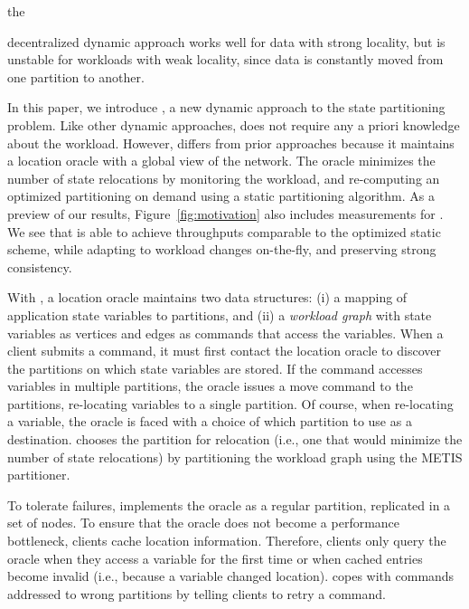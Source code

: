 the {decentralized dynamic approach works well for data with strong
  locality, but is unstable for workloads with weak locality, since
  data is constantly moved from one partition to another.


In this paper, we introduce \dynastar, a new dynamic approach to the
state partitioning problem.  Like other dynamic approaches, \dynastar
does not require any a priori knowledge about the workload. However,
\dynastar differs from prior approaches because it maintains a
location oracle with a global view of the network.  The oracle minimizes the
number of state relocations by monitoring the workload, and
re-computing an optimized partitioning on demand using a static
partitioning algorithm.  As a preview of our results,
Figure~\ref{fig:motivation} also includes measurements for \dynastar.
We see that \dynastar is able to achieve throughputs comparable to
the optimized static scheme, while adapting to workload changes
on-the-fly, and preserving strong consistency.


With \dynastar, a location oracle maintains two data structures: (i) a
mapping of application state variables to partitions, and (ii) a \emph{workload graph}
with state variables as vertices and edges as commands that access the
variables.  When a client submits a command, it must first contact the
location oracle to discover the partitions on which state variables are
stored.  If the command accesses variables in multiple partitions, the
oracle issues a move command to the partitions, re-locating variables to
a single partition. Of course, when re-locating a variable, the oracle
is faced with a choice of which partition to use as a destination.
\dynastar chooses the partition for relocation (i.e., one that
would minimize the number of state relocations) by partitioning the
workload graph using the METIS partitioner.

To tolerate failures, \dynastar implements the oracle as a regular partition, replicated in a set of nodes.
To ensure that the oracle does not become a performance bottleneck, clients cache location information.
Therefore, clients only query the oracle when they access a variable for the first time or when cached entries become invalid (i.e., because a variable changed location).
\dynastar copes with commands addressed to wrong partitions by telling clients to retry a command.

}
